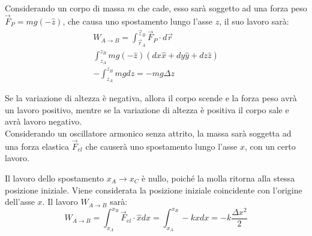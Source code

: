 \documentclass{article}
\numberwithin{equation}{subsection}
\begin{document}
Considerando un corpo di massa $m$ che cade, esso sarà soggetto 
ad una forza peso $\vec{F}_P=mg(-\hat{z})$, che causa uno spostamento 
lungo l'asse $z$, il suo lavoro sarà:
\begin{gather}
    W_{A\to B}=\displaystyle\int_{\vec{r}_A}^{\vec{z}_B}\vec{F}_P\cdot d\vec{r}\\
    \displaystyle\int_{z_A}^{z_B}mg(-\hat{z})(dx\hat{x}+dy\hat{y}+dz\hat{z})\\
    \displaystyle-\int_{z_A}^{z_B}mgdz=-mg\Delta z
\end{gather}
\begin{center}\end{center}

Se la variazione di altezza è negativa, allora il corpo 
scende e la forza peso avrà un lavoro positivo, mentre 
se la variazione di altezza è positiva il corpo sale e avrà 
lavoro negativo.\\

Considerando un oscillatore armonico senza attrito, la massa 
sarà soggetta ad una forza elastica $\vec{F}_{el}$ che causerà uno 
spostamento lungo l'asse $x$, con un certo lavoro.
\begin{center}\end{center} 
Il lavoro dello spostamento $x_A\to x_C$ è nullo, poiché la molla 
ritorna alla stessa posizione iniziale. Viene considerata la posizione 
iniziale coincidente con l'origine dell'asse $x$. 
Il lavoro $W_{A\to B}$ sarà:
\begin{equation}
    W_{A\to B}=\displaystyle\int_{x_A}^{x_B}\vec{F}_{el}\cdot\hat{x}dx=\int_{x_A}^{x_B}-kxdx=-k\frac{\Delta x^{2}}{2}
\end{equation}
\end{document}
